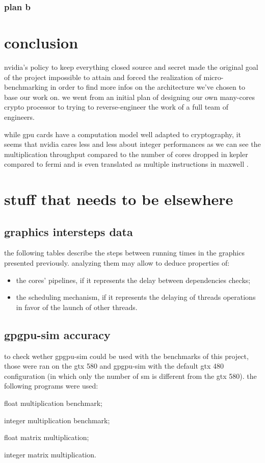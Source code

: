 \documentclass{report}
\begin{document}
   \subsection{plan b}
   
\chapter{conclusion}
    nvidia's policy to keep everything closed source and secret made the original 
    goal of the project impossible to attain and forced the realization of micro-benchmarking 
    in order to find more infos on the architecture we've chosen to base our work on. we went 
    from an initial plan of designing our own many-cores crypto processor to trying to 
    reverse-engineer the work of a full team of engineers.
    
    while gpu cards have a computation model well adapted to cryptography, it seems that nvidia
    cares less and less about integer performances as we can see the multiplication throughput
    compared to the number of cores dropped in kepler compared to fermi and is even translated as
    multiple instructions in maxwell \cite{cudaprog}.
   
  \appendix 
   
\chapter{stuff that needs to be elsewhere}
    \section{graphics intersteps data}
    the following tables describe the steps between running times in the graphics presented previously. analyzing them may allow to deduce properties of: 
    \begin{itemize} 
        \item the cores' pipelines, if it represents the delay between dependencies checks;
        \item the scheduling mechanism, if it represents the delaying of threads operations in favor of the launch of other threads.
    \end{itemize}
    
    \centering
    
    
    \pagebreak
    
    \section{gpgpu-sim accuracy}
        to check wether gpgpu-sim could be used with the benchmarks of this project, those were ran on the gtx 580 and gpgpu-sim with the default gtx 480 configuration (in which
        only the number of sm is different from the gtx 580). the following programs were used:
        \item float multiplication benchmark;
        \item integer multiplication benchmark;
        \item float matrix multiplication;
        \item integer matrix multiplication.
\end{document}
